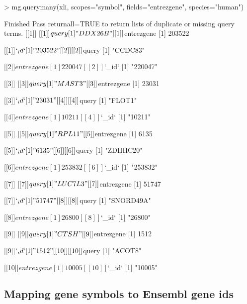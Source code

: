 \documentclass[12pt]{article}
\begin{document}
\begin{Schunk}
\begin{Sinput}
> mg.querymany(xli, scopes="symbol", fields="entrezgene", species="human")
\end{Sinput}
\begin{Soutput}
Finished
Pass returnall=TRUE to return lists of duplicate or missing query terms.
[[1]]
[[1]]$query
[1] "DDX26B"

[[1]]$entrezgene
[1] 203522

[[1]]$`_id`
[1] "203522"


[[2]]
[[2]]$query
[1] "CCDC83"

[[2]]$entrezgene
[1] 220047

[[2]]$`_id`
[1] "220047"


[[3]]
[[3]]$query
[1] "MAST3"

[[3]]$entrezgene
[1] 23031

[[3]]$`_id`
[1] "23031"


[[4]]
[[4]]$query
[1] "FLOT1"

[[4]]$entrezgene
[1] 10211

[[4]]$`_id`
[1] "10211"


[[5]]
[[5]]$query
[1] "RPL11"

[[5]]$entrezgene
[1] 6135

[[5]]$`_id`
[1] "6135"


[[6]]
[[6]]$query
[1] "ZDHHC20"

[[6]]$entrezgene
[1] 253832

[[6]]$`_id`
[1] "253832"


[[7]]
[[7]]$query
[1] "LUC7L3"

[[7]]$entrezgene
[1] 51747

[[7]]$`_id`
[1] "51747"


[[8]]
[[8]]$query
[1] "SNORD49A"

[[8]]$entrezgene
[1] 26800

[[8]]$`_id`
[1] "26800"


[[9]]
[[9]]$query
[1] "CTSH"

[[9]]$entrezgene
[1] 1512

[[9]]$`_id`
[1] "1512"


[[10]]
[[10]]$query
[1] "ACOT8"

[[10]]$entrezgene
[1] 10005

[[10]]$`_id`
[1] "10005"
\end{Soutput}
\end{Schunk}

\subsection{Mapping gene symbols to Ensembl gene ids}
\end{document}
